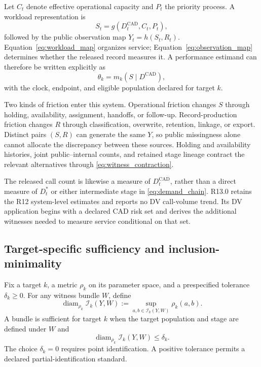 \documentclass[11pt]{article}
\begin{document}
Let $C_t$ denote effective operational capacity and $P_t$ the priority process. A workload representation is
\begin{equation}
S_t=g(D_t^{\mathrm{CAD}},C_t,P_t),
\label{eq:workload_map}
\end{equation}
followed by the public observation map $Y_t=h(S_t,R_t)$. Equation~\eqref{eq:workload_map} organizes service; Equation~\eqref{eq:observation_map} determines whether the released record measures it. A performance estimand can therefore be written explicitly as
\begin{equation}
\theta_k=m_k\!\left(S\mid D^{\mathrm{CAD}}\right),
\label{eq:conditional_performance}
\end{equation}
with the clock, endpoint, and eligible population declared for target $k$.

Two kinds of friction enter this system. Operational friction changes $S$ through holding, availability, assignment, handoffs, or follow-up. Record-production friction changes $R$ through classification, overwrite, retention, linkage, or export. Distinct pairs $(S,R)$ can generate the same $Y$, so public missingness alone cannot allocate the discrepancy between these sources. Holding and availability histories, joint public--internal counts, and retained stage lineage contract the relevant alternatives through \cref{eq:witness_contraction}.

The released call count is likewise a measure of $D_t^{\mathrm{CAD}}$, rather than a direct measure of $D_t^*$ or either intermediate stage in \cref{eq:demand_chain}. R13.0 retains the R12 system-level estimates and reports no DV call-volume trend. Its DV application begins with a declared CAD risk set and derives the additional witnesses needed to measure service conditional on that set.

\subsection{Target-specific sufficiency and inclusion-minimality}
\label{sec:witness_minimality}

Fix a target $k$, a metric $\rho_k$ on its parameter space, and a prespecified tolerance $\delta_k\ge 0$. For any witness bundle $W$, define
\begin{equation}
\operatorname{diam}_{\rho_k}\mathcal I_k(Y,W)
:=
\sup_{a,b\in\mathcal I_k(Y,W)}\rho_k(a,b).
\label{eq:identified_diameter}
\end{equation}
A bundle is sufficient for target $k$ when the target population and stage are defined under $W$ and
\begin{equation}
\operatorname{diam}_{\rho_k}\mathcal I_k(Y,W)\le\delta_k.
\label{eq:witness_sufficiency}
\end{equation}
The choice $\delta_k=0$ requires point identification. A positive tolerance permits a declared partial-identification standard.
\end{document}
